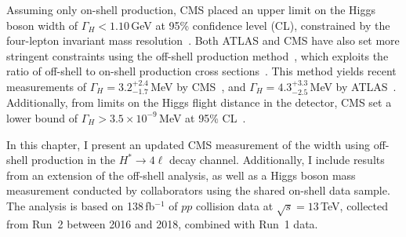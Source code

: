 Assuming only on-shell production, CMS placed an upper limit on the Higgs boson width of $\Gamma_H < 1.10$\,GeV at 95\% confidence level (CL), constrained by the four-lepton invariant mass resolution~\cite{Khachatryan:2014jba, Sirunyan:2017exp}. Both ATLAS and CMS have also set more stringent constraints using the off-shell production method~\cite{Khachatryan:2014iha, Aad:2015xua, Khachatryan:2015mma, Khachatryan:2016ctc, Aaboud:2018puo, Sirunyan:2019twz, CMS:2022ley}, which exploits the ratio of off-shell to on-shell production cross sections~\cite{Caola:2013yja, Kauer:2012hd, Campbell:2013una}. This method yields recent measurements of $\Gamma_H = 3.2^{+2.4}_{-1.7}$\,MeV by CMS~\cite{CMS:2022ley}, and $\Gamma_H = 4.3^{+3.3}_{-2.5}$\,MeV by ATLAS~\cite{atlascollaboration2023evidence}. Additionally, from limits on the Higgs flight distance in the detector, CMS set a lower bound of $\Gamma_H > 3.5 \times 10^{-9}$\,MeV at 95\% CL~\cite{Khachatryan:2015mma}.

In this chapter, I present an updated CMS measurement of the \Hboson width using off-shell production in the $H^* \to 4\ell$ decay channel. Additionally, I include results from an extension of the off-shell analysis, as well as a Higgs boson mass measurement conducted by collaborators using the shared on-shell data sample. The analysis is based on 138\,fb$^{-1}$ of $pp$ collision data at $\sqrt{s} = 13$\,TeV, collected from Run~2 between 2016 and 2018, combined with Run~1 data.









